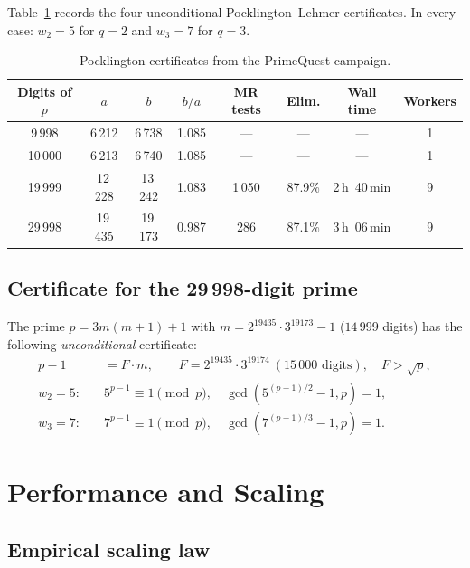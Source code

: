 \documentclass[11pt,a4paper]{article}
\theoremstyle{plain}
\theoremstyle{definition}
\begin{document}
\begin{computational}
Table~\ref{tab:certificates} records the four unconditional
Pocklington--Lehmer certificates. In every case:
$w_2 = 5$ for $q = 2$ and $w_3 = 7$ for $q = 3$.
\end{computational}

\begin{table}[ht]
\centering
\caption{Pocklington certificates from the PrimeQuest campaign.}
\label{tab:certificates}
\begin{tabular}{c c c c c c c c}
\toprule
Digits of $p$ & $a$ & $b$ & $b/a$ & MR tests & Elim. & Wall time & Workers \\
\midrule
9\,998   & 6\,212  & 6\,738  & 1.085 & ---    & ---    & ---           & 1 \\
10\,000  & 6\,213  & 6\,740  & 1.085 & ---    & ---    & ---           & 1 \\
19\,999  & 12\,228 & 13\,242 & 1.083 & 1\,050 & 87.9\% & 2\,h~40\,min  & 9 \\
29\,998  & 19\,435 & 19\,173 & 0.987 & 286    & 87.1\% & 3\,h~06\,min  & 9 \\
\bottomrule
\end{tabular}
\end{table}

\subsection{Certificate for the 29\,998-digit prime}

\begin{rigorousbox}
The prime $p = 3m(m+1) + 1$ with $m = 2^{19435} \cdot 3^{19173} - 1$
($14\,999$ digits) has the following \emph{unconditional} certificate:
\begin{align*}
p - 1 &= F \cdot m, \qquad F = 2^{19435} \cdot 3^{19174}\ (15\,000 \text{ digits}),
\quad F > \sqrt{p}, \\
w_2 = 5: \quad & 5^{p-1} \equiv 1 \pmod{p}, \quad \gcd(5^{(p-1)/2} - 1, p) = 1, \\
w_3 = 7: \quad & 7^{p-1} \equiv 1 \pmod{p}, \quad \gcd(7^{(p-1)/3} - 1, p) = 1.
\end{align*}
\end{rigorousbox}

\section{Performance and Scaling}
\label{sec:performance}

\subsection{Empirical scaling law}
\end{document}
